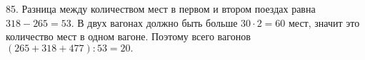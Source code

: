 85. Разница между количеством мест в первом и втором поездах равна $318-265=53.$ В двух вагонах должно быть больше $30\cdot2=60$ мест, значит это количество мест в одном вагоне. Поэтому всего вагонов $(265+318+477):53=20.$\\
